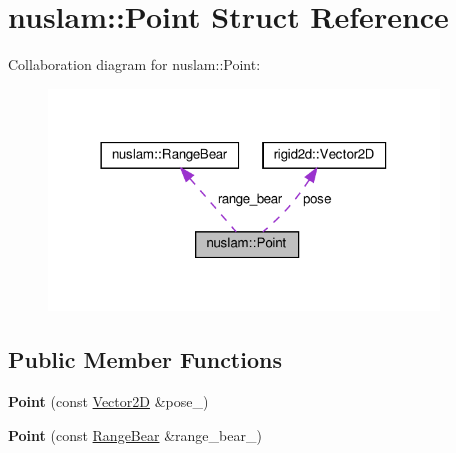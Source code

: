 \hypertarget{structnuslam_1_1Point}{}\section{nuslam\+:\+:Point Struct Reference}
\label{structnuslam_1_1Point}


Collaboration diagram for nuslam\+:\+:Point\+:\nopagebreak
\begin{figure}[H]
\begin{center}
\leavevmode
\includegraphics[width=294pt]{d4/d4a/structnuslam_1_1Point__coll__graph}
\end{center}
\end{figure}
\subsection*{Public Member Functions}
\begin{DoxyCompactItemize}
\item 
\mbox{\label{structnuslam_1_1Point_a1cd12ede357a20cfbc3d640cea56a9ba}} 
{\bfseries Point} (const \hyperlink{structrigid2d_1_1Vector2D}{Vector2D} \&pose\+\_\+)
\item 
\mbox{\label{structnuslam_1_1Point_ae021d2a3b0c1fc860170204937266e0b}} 
{\bfseries Point} (const \hyperlink{structnuslam_1_1RangeBear}{Range\+Bear} \&range\+\_\+bear\+\_\+)
\end{DoxyCompactItemize}
